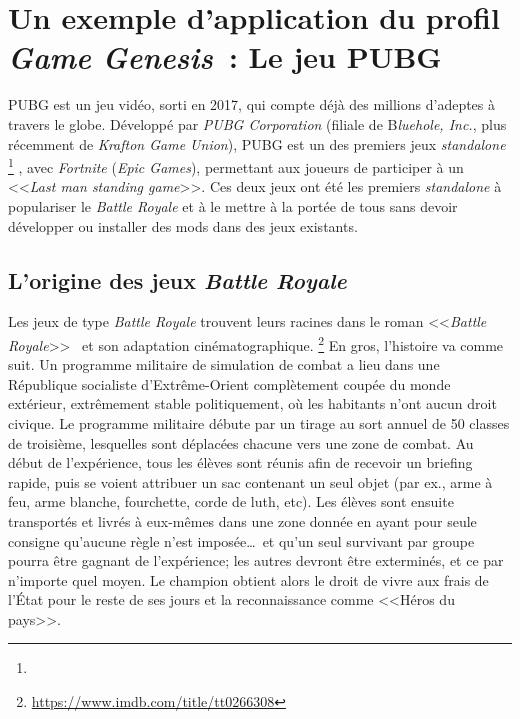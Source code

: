 \chapter{Un exemple d'application du profil \emph{Game Genesis}~: Le jeu PUBG}

PUBG est un jeu vidéo, sorti en 2017, qui compte d\'ej\`a des millions d'adeptes à travers le globe. Développé par \emph{PUBG Corporation} (filiale de B\emph{luehole, Inc.}, plus récemment de \emph{Krafton Game Union}), PUBG est un des premiers jeux \emph{standalone}%
\footnote{}
%
, avec  \emph{Fortnite} (\emph{Epic Games}),
permettant aux joueurs de participer à un <<\emph{Last man standing game}>>. Ces deux jeux ont été les premiers \emph{standalone} à populariser le \emph{Battle Royale} et à le mettre à la portée de tous sans devoir développer ou installer des mods dans des jeux existants.



\section{L'origine des jeux \emph{Battle Royale}}



Les jeux de type \emph{Battle Royale} trouvent leurs racines dans le roman <<\emph{Battle Royale}>>~\cite{ReferencePourLeRomana} et son adaptation cinématographique.%
%
\footnote{\url{https://www.imdb.com/title/tt0266308}}
%
En gros, l'histoire va comme suit.
Un programme militaire de simulation de combat a lieu dans une République socialiste d'Extrême-Orient complètement coupée du monde extérieur, extrêmement stable politiquement, o\`u les habitants n'ont aucun droit civique. Le programme militaire d\'ebute par un tirage au sort annuel de 50 classes de troisième, lesquelles sont déplacées chacune vers une zone de combat. Au début de l'expérience, tous les élèves sont réunis afin de recevoir un briefing rapide, puis se voient attribuer un sac contenant un seul objet (par ex., arme à feu, arme blanche, fourchette, corde de luth, etc). Les \'el\`eves sont ensuite transport\'es et livrés à eux-mêmes dans une zone donnée en ayant pour seule consigne qu'aucune règle n'est imposée\ldots\ et qu'un seul survivant par groupe pourra être gagnant de l'expérience;  les autres devront être exterminés, et ce par n'importe quel moyen. Le champion  obtient alors le droit de vivre aux frais de l'État pour le reste de ses jours et la reconnaissance comme <<Héros du pays>>.

